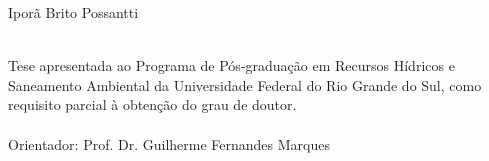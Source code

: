 \documentclass[./main.tex]{subfiles}
\begin{document}
\doublespacing %
\large

\newpage
\renewcommand{\headrulewidth}{0pt}
\thispagestyle{fancy}
\fancyhf{} %
\fancyfoot{} %
\fancyfoot[C]{\thepage}

\begin{center}
	\selectfont Iporã Brito Possantti\\
	\vspace{30mm}
	\selectfont \docTitle\\
	\vspace{30mm}
\end{center}
\begin{adjustwidth}{250pt}{0pt}
	\singlespacing
	\selectfont Tese apresentada ao Programa de Pós-graduação em Recursos Hídricos e Saneamento Ambiental da Universidade Federal do Rio Grande do Sul, como requisito parcial à obtenção do grau de doutor. \\ \\ Orientador: Prof. Dr. Guilherme Fernandes Marques 
\end{adjustwidth}
\clearpage
\end{document}
